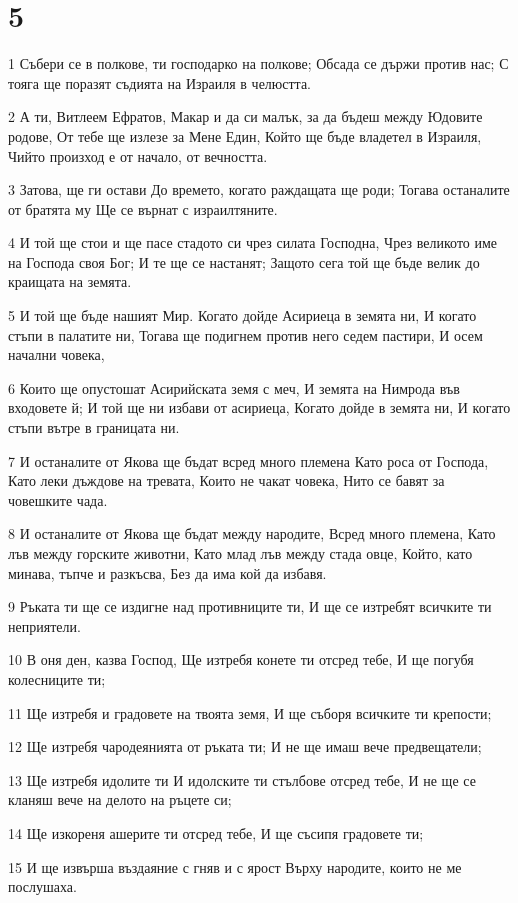 \chapter{5}

\par 1 Събери се в полкове, ти господарко на полкове; Обсада се държи против нас; С тояга ще поразят съдията на Израиля в челюстта.
\par 2 А ти, Витлеем Ефратов, Макар и да си малък, за да бъдеш между Юдовите родове, От тебе ще излезе за Мене Един, Който ще бъде владетел в Израиля, Чийто произход е от начало, от вечността.
\par 3 Затова, ще ги остави До времето, когато раждащата ще роди; Тогава останалите от братята му Ще се върнат с израилтяните.
\par 4 И той ще стои и ще пасе стадото си чрез силата Господна, Чрез великото име на Господа своя Бог; И те ще се настанят; Защото сега той ще бъде велик до краищата на земята.
\par 5 И той ще бъде нашият Мир. Когато дойде Асириеца в земята ни, И когато стъпи в палатите ни, Тогава ще подигнем против него седем пастири, И осем начални човека,
\par 6 Които ще опустошат Асирийската земя с меч, И земята на Нимрода във входовете й; И той ще ни избави от асириеца, Когато дойде в земята ни, И когато стъпи вътре в границата ни.
\par 7 И останалите от Якова ще бъдат всред много племена Като роса от Господа, Като леки дъждове на тревата, Които не чакат човека, Нито се бавят за човешките чада.
\par 8 И останалите от Якова ще бъдат между народите, Всред много племена, Като лъв между горските животни, Като млад лъв между стада овце, Който, като минава, тъпче и разкъсва, Без да има кой да избавя.
\par 9 Ръката ти ще се издигне над противниците ти, И ще се изтребят всичките ти неприятели.
\par 10 В оня ден, казва Господ, Ще изтребя конете ти отсред тебе, И ще погубя колесниците ти;
\par 11 Ще изтребя и градовете на твоята земя, И ще съборя всичките ти крепости;
\par 12 Ще изтребя чародеянията от ръката ти; И не ще имаш вече предвещатели;
\par 13 Ще изтребя идолите ти И идолските ти стълбове отсред тебе, И не ще се кланяш вече на делото на ръцете си;
\par 14 Ще изкореня ашерите ти отсред тебе, И ще съсипя градовете ти;
\par 15 И ще извърша въздаяние с гняв и с ярост Върху народите, които не ме послушаха.

